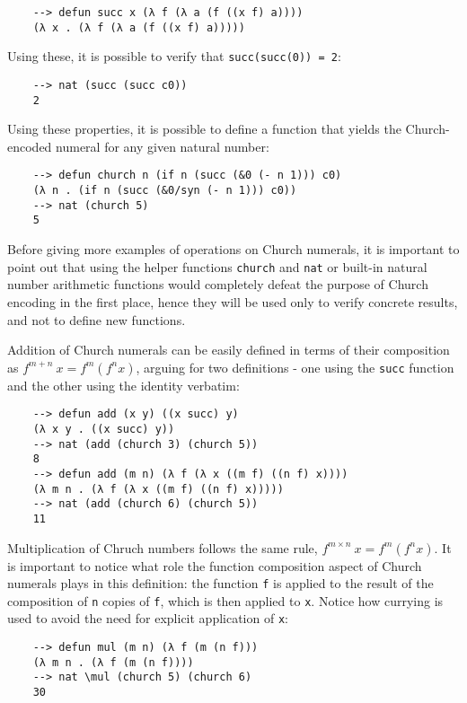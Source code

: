 \begin{Verbatim}
    --> defun succ x (λ f (λ a (f ((x f) a))))
    (λ x . (λ f (λ a (f ((x f) a)))))
\end{Verbatim}

Using these, it is possible to verify that \verb|succ(succ(0)) = 2|:

\begin{Verbatim}
    --> nat (succ (succ c0))
    2
\end{Verbatim}

Using these properties, it is possible to define a function that yields the Church-encoded numeral for any given natural number:

\begin{Verbatim}
    --> defun church n (if n (succ (&0 (- n 1))) c0)
    (λ n . (if n (succ (&0/syn (- n 1))) c0))
    --> nat (church 5)
    5
\end{Verbatim}

Before giving more examples of operations on Church numerals, it is important to point out that using the helper functions \verb|church| and \verb|nat| or built-in natural number arithmetic functions would completely defeat the purpose of Church encoding in the first place, hence they will be used only to verify concrete results, and not to define new functions.

Addition of Church numerals can be easily defined in terms of their composition as $f^{m+n}\ x = f^m (f^n x) $, arguing for two definitions - one using the \verb|succ| function and the other using the identity verbatim:

\begin{Verbatim}
    --> defun add (x y) ((x succ) y)
    (λ x y . ((x succ) y))
    --> nat (add (church 3) (church 5))
    8
    --> defun add (m n) (λ f (λ x ((m f) ((n f) x))))
    (λ m n . (λ f (λ x ((m f) ((n f) x)))))
    --> nat (add (church 6) (church 5))
    11
\end{Verbatim}

Multiplication of Chruch numbers follows the same rule, $f^{m\times n}\ x = f^m (f^n x)$. It is important to notice what role the function composition aspect of Church numerals plays in this definition: the function \verb|f| is applied to the result of the composition of \verb|n| copies of \verb|f|, which is then applied to \verb|x|. Notice how currying is used to avoid the need for explicit application of \verb|x|:

\begin{Verbatim}
    --> defun mul (m n) (λ f (m (n f)))
    (λ m n . (λ f (m (n f))))
    --> nat \mul (church 5) (church 6)
    30
\end{Verbatim}

